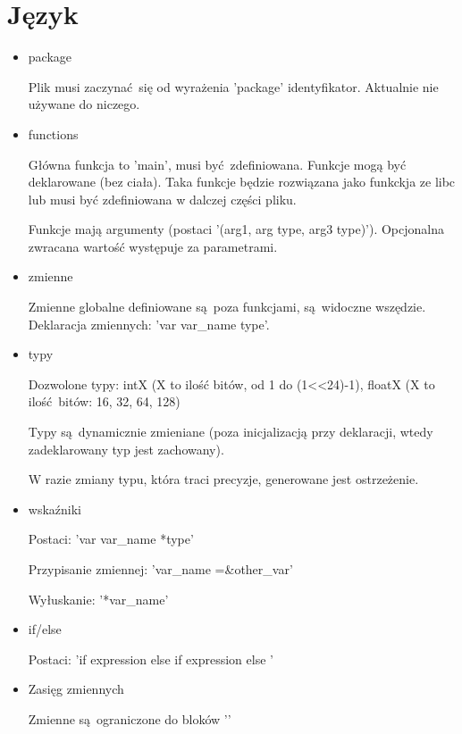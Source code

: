 \documentclass[a4paper,16pt]{article}
\begin{document}
    \section{Język}
    \begin{itemize}
    	\item package
    	
    	Plik musi zaczynać się od wyrażenia 'package' identyfikator.
    	Aktualnie nie używane do niczego.
    	
    	\item functions
    	
    	Główna funkcja to 'main', musi być zdefiniowana.
    	Funkcje mogą być deklarowane (bez ciała). Taka funkcje będzie rozwiązana jako funkckja ze libc lub musi być zdefiniowana w dalczej części pliku.
    	
    	Funkcje mają argumenty (postaci '(arg1, arg type, arg3 type)').
    	Opcjonalna zwracana wartość występuje za parametrami.
    	
    	\item zmienne
    	
    	Zmienne globalne definiowane są poza funkcjami, są widoczne wszędzie.
    	Deklaracja zmiennych: 'var var\_name type'.
    	
    	\item typy
    	
    	Dozwolone typy: intX (X to ilość bitów, od 1 do (1<<24)-1), floatX (X to ilość bitów: 16, 32, 64, 128)
    	
    	Typy są dynamicznie zmieniane (poza inicjalizacją przy deklaracji, wtedy zadeklarowany typ jest zachowany).
    	
    	W razie zmiany typu, która traci precyzje, generowane jest ostrzeżenie.
    	
    	\item wskaźniki
    	
    	Postaci: 'var var\_name *type'
    	
    	Przypisanie zmiennej: 'var\_name =\&other\_var'
    	
    	Wyłuskanie: '*var\_name'
		    	    	
    	\item if/else
    	
    	Postaci: 'if expression {} else if expression {} else {}'
    	
    	\item Zasięg zmiennych
    	
    	Zmienne są ograniczone do bloków '{}'
    	
    	
    \end{itemize}
\end{document}
